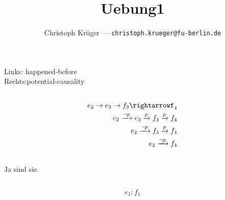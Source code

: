 \documentclass{scrartcl}
\title{
	Uebung1
}
\author{
	Christoph Krüger --- \texttt{christoph.krueger@fu-berlin.de}
}
\begin{document}
\section{}
\subsection{}
Links: happened-before\\
Rechts:potential-causality

\subsection{}
\begin{align*}
e_2  \rightarrow e_3 \rightarrow f_3 \rightarrowf_4\\
e_2  \xrightarrow{\neg p} e_3 \xrightarrow{p} f_3 \xrightarrow{p} f_4\\
e_2  \xrightarrow{\neg p} f_3 \xrightarrow{p}f_4\\
e_2  \xrightarrow{\neg p} f_4\\
\end{align*}

\subsection{}
Ja sind sie.

\subsection{}
\[e_1:f_1\]
\end{document}

